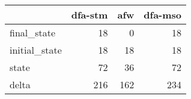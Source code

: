 \begin{tabular}{lrrr}
\toprule
{} &  dfa-stm &  afw &  dfa-mso \\
\midrule
final\_state   &       18 &    0 &       18 \\
initial\_state &       18 &   18 &       18 \\
state         &       72 &   36 &       72 \\
delta         &      216 &  162 &      234 \\
\bottomrule
\end{tabular}
